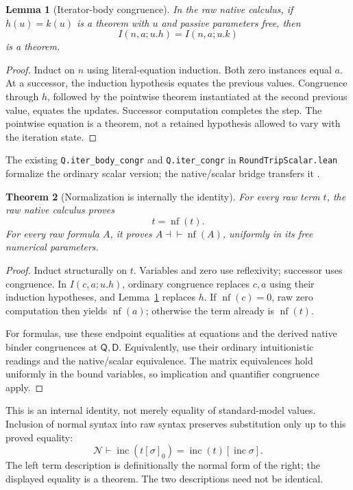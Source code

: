 \documentclass[11pt]{article}
\newtheorem{theorem}{Theorem}[section]
\newtheorem{lemma}[theorem]{Lemma}
\newcommand{\N}{\mathcal N}
\newcommand{\Q}{\mathsf Q}\newcommand{\D}{\mathsf D}
\newcommand{\nf}{\operatorname{nf}}\newcommand{\It}{\widehat I}
\newcommand{\Eqv}{\dashv\vdash}
\newcommand{\code}[1]{\nolinkurl{#1}}
\begin{document}
\begin{lemma}[Iterator-body congruence]\label{lem:body}
In the raw native calculus, if \(h(u)=k(u)\) is a theorem with \(u\)
and passive parameters free, then
\[
                  I(n,a;u.h)=I(n,a;u.k)
\]
is a theorem.
\end{lemma}
\begin{proof}
Induct on \(n\) using literal-equation induction.
Both zero instances equal \(a\).
At a successor, the induction hypothesis equates the previous
values. Congruence through \(h\), followed by the pointwise theorem
instantiated at the second previous value, equates the updates.
Successor computation completes the step.
The pointwise equation is a theorem, not a retained hypothesis
allowed to vary with the iteration state.
\end{proof}
The existing \code{Q.iter_body_congr} and \code{Q.iter_congr} in
\code{RoundTripScalar.lean} formalize the ordinary scalar version;
the native/scalar bridge transfers it \cite{roundtrip,nativebridge}.

\begin{theorem}[Normalization is internally the identity]\label{thm:nfeq}
For every raw term \(t\), the raw native calculus proves
\[
                            t=\nf(t).                   \tag{NI}\label{eq:nfeq}
\]
For every raw formula \(A\), it proves \(A\Eqv\nf(A)\), uniformly
in its free numerical parameters.
\end{theorem}
\begin{proof}
Induct structurally on \(t\). Variables and zero use reflexivity;
successor uses congruence. In \(I(c,a;u.h)\), ordinary congruence
replaces \(c,a\) using their induction hypotheses, and
Lemma~\ref{lem:body} replaces \(h\).
If \(\nf(c)=0\), raw zero computation then yields \(\nf(a)\);
otherwise the term already is \(\nf(t)\).

For formulas, use these endpoint equalities at equations and
the derived native binder congruences at \(\Q,\D\).
Equivalently, use their ordinary intuitionistic readings and the
native/scalar equivalence. The matrix equivalences hold uniformly
in the bound variables, so implication and quantifier congruence
apply.
\end{proof}

This is an internal identity, not merely equality of standard-model
values. Inclusion of normal syntax into raw syntax preserves
substitution only up to this proved equality:
\[
 \N\vdash
 \operatorname{inc}(t[\sigma]_0)
 =\operatorname{inc}(t)[\operatorname{inc}\sigma].
\]
The left term description is definitionally the normal form of the
right; the displayed equality is a theorem. The two descriptions need
not be identical.
\end{document}

